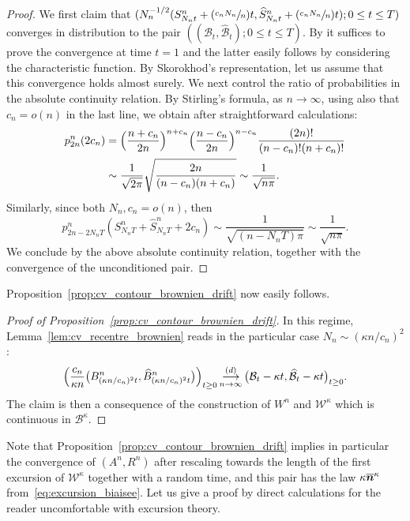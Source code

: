 \documentclass[JEP,XML,SOM,Unicode,NoFloatCountersInSection,NoEqCountersInSection]{cedram}
\newcommand{\Psfrac}[2]{(\sfrac{#1}{#2})}
\newcommand{\bmn}{\protect\boldsymbol{n}}
\theoremstyle{plain}
\theoremstyle{definition}
\theoremstyle{remark}
\newcommand{\cvloi}[1][n]{\,\mathop{\longrightarrow}^{(d)}_{#1 \to \infty}\,}
\begin{document}
\begin{proof}
We first claim that $(N_{n}^{-1/2} (S^{n}_{N_{n}t}+\Psfrac{c_{n} N_{n}}{n}t, \widehat{S}^{n}_{N_{n}t}+\Psfrac{c_{n} N_{n}}{n}t) ; 0 \le t \le T)$ converges in distribution to the pair $((\mathcal{B}_{t}, \widehat{\mathcal{B}}_{t}) ; 0 \le t \le T)$. By \eg \cite[Th.\,16.14]{Kal02} it suffices to prove the convergence at time $t=1$ and the latter easily follows by considering the characteristic function.
By Skorokhod's representation, let us assume that this convergence holds almost surely. We next control the ratio of probabilities in the absolute continuity relation.
By Stirling's formula, as $n\to\infty$, using also that $c_{n} = o(n)$ in the last line, we obtain after straightforward calculations:\vspace*{-3pt}
\begin{align*}
p^n_{2n}(2c_{n})
&= \Bigl(\frac{n+c_{n}}{2n}\Bigr)^{n+c_{n}} \Bigl(\frac{n-c_{n}}{2n}\Bigr)^{n-c_{n}} \frac{(2n)!}{(n-c_{n})! (n+c_{n})!}
\\
&\sim \frac{1}{\sqrt{2\pi}} \sqrt{\frac{2n}{(n-c_{n}) (n+c_{n})}} \sim \frac{1}{\sqrt{n\pi}}.
\end{align*}
Similarly, since both $N_{n}, c_{n} = o(n)$, then
\[
p^n_{2n-2N_{n}T}(S^{n}_{N_{n}T}+\widehat{S}^{n}_{N_{n}T}+2c_{n})
\sim \frac{1}{\sqrt{(n-N_{n}T)\pi}}
\sim \frac{1}{\sqrt{n\pi}}.
\]
We conclude by the above absolute continuity relation, together with the convergence of the unconditioned pair.
\end{proof}

Proposition~\ref{prop:cv_contour_brownien_drift} now easily follows.

\begin{proof}[Proof of Proposition~\ref{prop:cv_contour_brownien_drift}]
In this regime, Lemma~\ref{lem:cv_recentre_brownien} reads in the particular case $N_n \sim (\kappa n/c_{n})^2$:
\begin{equation}\label{eq:cv_brownien_drift}
\Bigl(\frac{c_{n}}{\kappa n} \bigl(B^{n}_{(\kappa n/c_{n})^2 t}, \widehat{B}^{n}_{(\kappa n/c_{n})^2 t}\bigr)\Bigl)_{t \ge 0}
\cvloi \bigl(\mathcal{B}_{t}-\kappa t, \widehat{\mathcal{B}}_{t}-\kappa t\bigr)_{t \ge 0}.
\end{equation}
The claim is then a consequence of the construction of $W^n$ and $\mathcal{W}^\kappa$ which is continuous in $\mathcal{B}^\kappa$.
\end{proof}

Note that Proposition~\ref{prop:cv_contour_brownien_drift} implies in particular the convergence of $(A^n, R^n)$ after rescaling towards the length of the first excursion of $\mathcal{W}^\kappa$ together with a random time, and this pair has the law $\kappa \overline{\bmn}^\kappa$ from~\eqref{eq:excursion_biaisee}. Let us give a proof by direct calculations for the reader uncomfortable with excursion theory.
\end{document}
